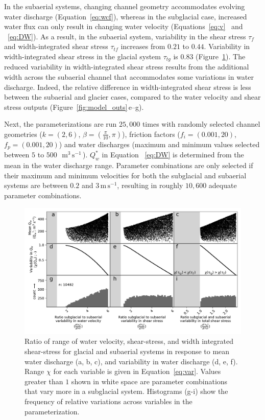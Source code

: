 \documentclass[draft]{agujournal2019}
\newcommand{\mmms}{$\,\mathrm{m^3\, s^{-1}}$\,}
\newcommand{\unit}[1]{$\mathrm{#1}$}
\begin{document}
  In the subaerial systems, changing channel geometry accommodates evolving water discharge  (Equation~\ref{eq:wcf}), whereas in the subglacial case, increased water flux can only result in changing water velocity (Equations~\ref{eq:v}~ and ~\ref{eq:DW}).
  As a result, in the subaerial system, variability in the shear stress $\tau_f$ and width-integrated shear stress $\tau_{tf}$ increases from $0.21$ to $0.44$. Variability in width-integrated shear stress  in the glacial system $\tau_{tg}$ is $0.83$ (Figure~\ref{fig:range}).
  The reduced variability in width-integrated shear stress results from the additional width across the subaerial channel that accommodates some variations in water discharge.
  Indeed, the relative  difference in width-integrated shear stress is less between the subaerial and glacier cases, compared to the water velocity and shear stress outputs (Figure~\ref{fig:model_outs}\,e--g).

  
  Next, the parameterizations are run $25,000$ times with randomly selected channel geometries ($k=(2,6)$, $\beta=(\frac{\pi}{10},\pi)$), friction factors ($f_i=(0.001,20)$, $f_p=(0.001,20)$) and water discharges (maximum and minimum values selected between $5$ to $500$ \,\mmms). $Q_w^*$ in Equation ~\ref{eq:DW} is determined from the mean in the water discharge range. Parameter combinations are only selected if their maximum and minimum velocities for both the subglacial and subaerial systems are between $0.2$ and $3$\,\unit{m}\,\unit{s}$^{-1}$, resulting in roughly $10,600$ adequate parameter combinations. 
  
  
  \begin{center}
    \begin{figure}[H]
      \includegraphics[width=0.8\linewidth]{multi_run.pdf}
      \caption{Ratio of range of water velocity, shear-stress, and width integrated shear-stress for glacial and subaerial systems in response to mean water discharge (a, b, c), and  variability in water discharge (d, e, f).  
        Range  $\chi$ for each variable is given in Equation~\ref{eq:var}. Values greater than $1$ shown in white space are parameter combinations that vary more in a subglacial  system.
        Histograms (g-i) show the frequency of relative variations across variables in the parameterization.}
      \label{fig:range}
    \end{figure}
  \end{center}
  
\end{document}
